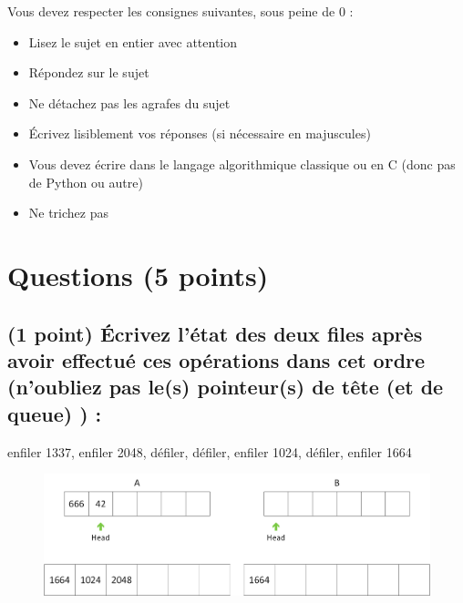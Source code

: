\documentclass[11pt,a4paper]{article}
\begin{document}
\MakeExamTitle                   %


\bigskip

Vous devez respecter les consignes suivantes, sous peine de 0 :

\begin{itemize}
\item Lisez le sujet en entier avec attention
\item Répondez sur le sujet
\item Ne détachez pas les agrafes du sujet
\item \'Ecrivez lisiblement vos réponses (si nécessaire en majuscules)
\item Vous devez écrire dans le langage algorithmique classique ou en C (donc pas de Python ou autre)
\item Ne trichez pas
\end{itemize}



\section{Questions (5 points)}

\subsection{(1 point) \'Ecrivez l'état des deux files après avoir effectué ces opérations dans cet ordre (n'oubliez pas le(s) pointeur(s) de tête (et de queue) ) : }

\bigskip

\vfill
\hspace{0pt}

\begin{center}

\begin{large}
enfiler 1337, enfiler 2048, défiler, défiler, enfiler 1024, défiler, enfiler 1664
\end{large}


\bigskip

\begin{figure}[ht!]
\centering
\centerline{  %
\includegraphics[scale=1]{img/correction_Exercice1_file.png}
}
\end{figure}

\end{center}
\end{document}
